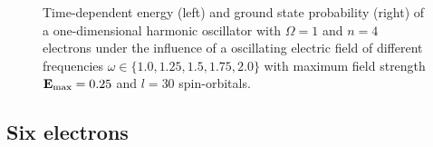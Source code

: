 \begin{figure}[!h]
{\begin{minipage}{0.6\textwidth}
    \end{minipage}
    }
    \caption{Time-dependent energy (left) and ground state probability (right)
        of a one-dimensional harmonic oscillator with $\Omega=1$
        and $n=4$ electrons under the influence of a oscillating electric field 
        of different frequencies $\omega\in\{1.0, 1.25, 1.5, 1.75, 2.0\}$ with 
        maximum field strength $\vb{E}_\text{max}=0.25$ and $l=30$ 
        spin-orbitals.
    }
    \label{fig:1d_n4_qd_resonance}
\end{figure}

\vfill
\pagebreak

\subsection*{Six electrons}

